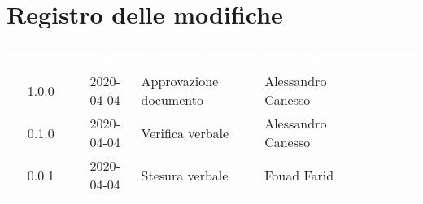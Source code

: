 \section*{Registro delle modifiche}
{
	\centering
	\begin{longtable}{ c c  C{4cm} C{4cm} C{3cm} }
		\textcolor{white}{\textbf{Versione}} & \textcolor{white}{\textbf{Data}} & \textcolor{white}{\textbf{Descrizione}} & \textcolor{white}{\textbf{Nominativo}} & \textcolor{white}{\textbf{Ruolo}}\\		
		1.0.0 & 2020-04-04 & Approvazione documento & Alessandro Canesso & \RdP{}\\
		0.1.0 & 2020-04-04 & Verifica verbale & Alessandro Canesso & \ver{} \\
		0.0.1 & 2020-04-04 & Stesura verbale & Fouad Farid &\reda{}\\		
		
	\end{longtable}

}